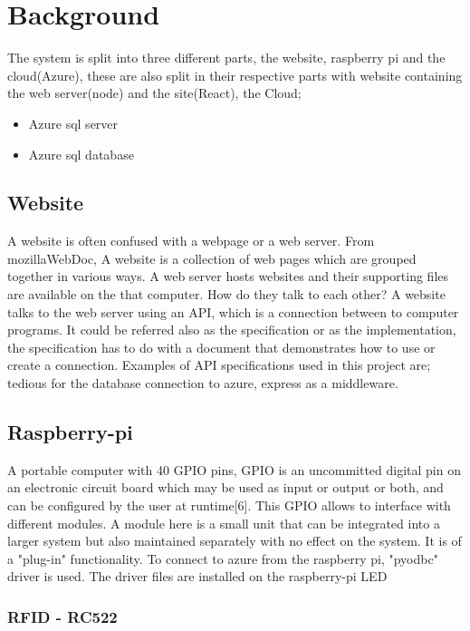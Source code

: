 \chapter{Background}
The system is split into three different parts, the website, raspberry pi and the cloud(Azure), these are also split in their respective parts with website containing the web server(node) and the site(React), the Cloud; 
\begin{itemize}
  \item Azure sql server
  \item Azure sql database
\end{itemize}
\section{Website}
A website is often confused with a webpage or a web server. From mozillaWebDoc, A website is a collection of web pages which are grouped together in various ways. A web server hosts websites and their supporting files are available on the that computer. 
How do they talk to each other?
A website talks to the web server using an API, which is a connection between to computer programs. It could be referred also as the specification or as the implementation, the specification has to do with a document that demonstrates how to use or create a connection. Examples of API specifications used in this project are; tedious for the database connection to azure, express as a middleware. 


\section{Raspberry-pi}
A portable computer with 40 GPIO pins, 
GPIO is an uncommitted digital pin on an electronic circuit board which may be used as input or output or both, and can be configured by the user at runtime[6]. This GPIO allows to interface with different modules. A module here is a small unit that can be integrated into a larger system but also maintained separately with no effect on the system. It is of a "plug-in" functionality.
To connect to azure from the raspberry pi, "pyodbc" driver is used. The driver files are installed on the raspberry-pi
LED  


\subsection{RFID - RC522}
